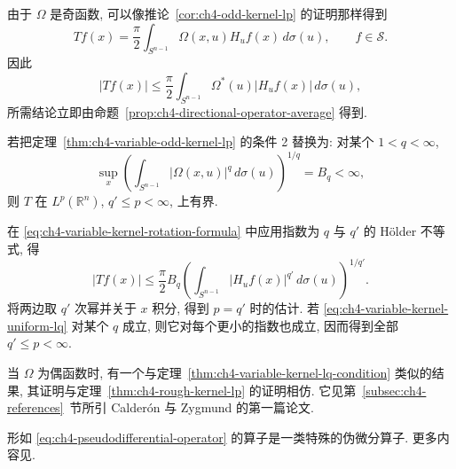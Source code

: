 \begin{Proof}
由于 $\Omega$ 是奇函数, 可以像推论~\ref{cor:ch4-odd-kernel-lp} 的证明那样得到
\begin{equation}
\label{eq:ch4-variable-kernel-rotation-formula}
 Tf(x)=\frac\pi2\int_{S^{n-1}}\Omega(x,u)H_uf(x)\,d\sigma(u),
 \qquad f\in\mathcal S.
\end{equation}
因此
\[
 |Tf(x)|\le\frac\pi2\int_{S^{n-1}}\Omega^*(u)|H_uf(x)|\,d\sigma(u),
\]
所需结论立即由命题~\ref{prop:ch4-directional-operator-average} 得到.
\end{Proof}

\begin{Theorem}
\label{thm:ch4-variable-kernel-lq-condition}
若把定理~\ref{thm:ch4-variable-odd-kernel-lp} 的条件 2 替换为: 对某个 $1<q<\infty$,
\begin{equation}
\label{eq:ch4-variable-kernel-uniform-lq}
 \sup_x\left(\int_{S^{n-1}}|\Omega(x,u)|^q\,d\sigma(u)\right)^{1/q}
 =B_q<\infty,
\end{equation}
则 $T$ 在 $L^p(\mathbb R^n)$, $q'\le p<\infty$, 上有界.
\end{Theorem}

\begin{Proof}
在 \eqref{eq:ch4-variable-kernel-rotation-formula} 中应用指数为 $q$ 与 $q'$ 的 Hölder 不等式, 得
\begin{equation}
\label{eq:ch4-variable-kernel-holder-bound}
 |Tf(x)|\le\frac\pi2B_q
 \left(\int_{S^{n-1}}|H_uf(x)|^{q'}\,d\sigma(u)\right)^{1/q'}.
\end{equation}
将两边取 $q'$ 次幂并关于 $x$ 积分, 得到 $p=q'$ 时的估计. 若 \eqref{eq:ch4-variable-kernel-uniform-lq} 对某个 $q$ 成立, 则它对每个更小的指数也成立, 因而得到全部 $q'\le p<\infty$.
\end{Proof}

\hypertarget{chapter-04-page-097}{}
当 $\Omega$ 为偶函数时, 有一个与定理~\ref{thm:ch4-variable-kernel-lq-condition} 类似的结果, 其证明与定理~\ref{thm:ch4-rough-kernel-lp} 的证明相仿. 它见第~\ref{subsec:ch4-references}~节所引 Calderón 与 Zygmund 的第一篇论文.

形如 \eqref{eq:ch4-pseudodifferential-operator} 的算子是一类特殊的伪微分算子. 更多内容见.
